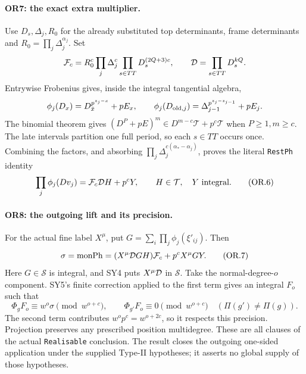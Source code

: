 \paragraph{OR7: the exact extra multiplier.}
Use $D_s,\Delta_j,R_0$ for the already substituted top determinants,
frame determinants and $R_0=\prod_j\Delta_j^{\alpha_j}$.
Set
\[
 {\cal F}_c=R_0^c\prod_j\Delta_j^c\prod_{s\in TT}D_s^{(2Q+3)c},
 \qquad {\cal D}=\prod_{s\in TT}D_s^{kQ}.
\]
Entrywise Frobenius gives, inside the integral tangential algebra,
\[
 \phi_j(D_x)=D_{\bar x}^{p^{z_j-x}}+pE_x,\qquad
 \phi_j(D_{{\rm old},j})=\Delta_{j-1}^{p^{z_j-z_{j-1}}}+pE_j.
\]
The binomial theorem gives
$(D^P+pE)^m\in D^{m-c}\mathcal T+p^c\mathcal T$ when $P\ge1,m\ge c$.
The late intervals partition one full period, so each $s\in TT$ occurs
once. Combining the factors, and absorbing
$\prod_j\Delta_j^{c(\alpha_*-\alpha_j)}$, proves the literal
\texttt{RestPh} identity
\[
                    \prod_j\phi_j(Dv_j)={\cal F}_c{\cal D}H+p^cY,
 \qquad H\in\mathcal T,\quad Y\text{ integral}.             \tag{OR.6}
\]

\paragraph{OR8: the outgoing lift and its precision.}
For the actual fine label $X^\mu$, put
$G=\sum_i\prod_j\phi_j(\xi'_{ij})$. Then
\[
 \sigma=\operatorname{monPh}
       =(X^\mu{\cal D}GH){\cal F}_c+p^cX^\mu GY.            \tag{OR.7}
\]
Here $G\in\mathcal S$ is integral, and SY4 puts
$X^\mu{\cal D}$ in $\mathcal S$. Take the normal-degree-$o$ component.
SY5's finite correction applied to the first term gives an integral
$F_o$ such that
\[
 \Phi_gF_o\equiv w^o\sigma\pmod{w^{o+c}},\qquad
 \Phi_{g'}F_o\equiv0\pmod{w^{o+c}}
 \quad(\Pi(g')\ne\Pi(g)).                                 \tag{OR.8}
\]
The second term contributes $w^op^c=w^{o+2c}$, so it respects this
precision. Projection preserves any prescribed position multidegree.
These are all clauses of the actual \texttt{Realisable} conclusion.
The result closes the outgoing one-sided application under the supplied
Type-II hypotheses; it asserts no global supply of those hypotheses.

